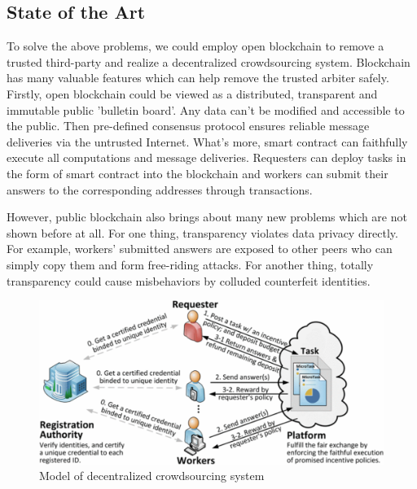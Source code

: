 \documentclass[conference]{IEEEtran}
\begin{document}
\subsection{State of the Art}
To solve the above problems, we could employ open blockchain to remove a trusted third-party and realize a decentralized crowdsourcing system.
%
Blockchain has many valuable features which can help remove the trusted arbiter safely. 
%
Firstly, open blockchain could be viewed as a distributed, transparent and immutable public 'bulletin board'.
%
Any data can't be modified and accessible to the public.
%
Then pre-defined consensus protocol ensures reliable message deliveries via the untrusted Internet. 
%
What's more, smart contract can faithfully execute all computations and message deliveries.
%
Requesters can deploy tasks in the form of smart contract into the blockchain and workers can submit their answers to the corresponding addresses through transactions.

However, public blockchain also brings about many new problems which are not shown before at all.
%
For one thing, transparency violates data privacy directly.
%
For example, workers' submitted answers are exposed to other peers who can simply copy them and form free-riding attacks.
%
For another thing, totally transparency could cause misbehaviors by colluded counterfeit identities.

\begin{figure}[ht]
    \centering
    \includegraphics[width= 0.95\linewidth]{fig/system1.pdf}
    \caption{Model of decentralized crowdsourcing system}
    \label{arch}
\end{figure}
\end{document}
